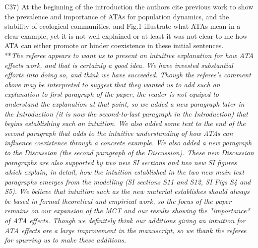 \documentclass[letterpaper,11pt]{article}
\begin{document}

\noindent C37) At the beginning of the introduction the authors cite previous work to show the prevalence and importance of ATAs for population dynamics, and the stability of ecological communities, and Fig.1 illustrate what ATAs mean in a clear example, yet it is not well explained or at least it was not clear to me how ATA can either promote or hinder coexistence in these initial sentences. \\

\noindent ***\emph{The referee appears to want us to present an intuitive explanation for how ATA effects work, and that 
is certainly a good idea. We have invested substantial efforts into doing so, and think we have succeeded. Though the referee's comment above may 
be interpreted to suggest that they wanted us
to add such an explanation to first paragraph of the paper, the reader is not equiped to understand the explanation at that 
point, so we added a new paragraph later in the Introduction (it is now the
second-to-last paragraph in the Introduction) that begins establishing such an intuition. We also added some text to the end of
the second paragraph that adds to the intuitive understanding of how ATAs can influence coexistence through a concrete 
example. We also added a new paragraph to the 
Discussion (the second paragraph of the Discussion). These new Discussion 
paragraphs are also supported by two new SI sections and two new SI figures which 
explain, in detail, how the intuition established in the two new main text paragraphs emerges from the modelling (SI sections S11 
and S12, SI Figs S4 and S5).
We believe that intuition such as the new material establishes should always be based in formal theoretical and 
empirical work, so the focus of the paper remains on our expansion of the MCT and our results showing
the *importance* of ATA effects. Though we definitely think our additions giving an intuition for ATA effects are a large
improvement in the manuscript, so we thank the referee for spurring us to make these additions.  } \\
\end{document}
